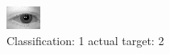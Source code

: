 \begin{figure}[h!]
\begin{center}
\includegraphics[width=0.60\columnwidth]{figures/ID370_class_1_target_2.png}
\end{center}
\caption{ Classification: 1 actual target: 2}
\label{fig:ID370_class_1_target_2}
\end{figure}
